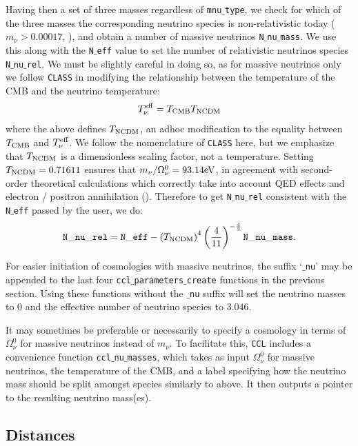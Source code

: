 \documentclass[\docopts]{\docclass}
\newcommand{\ccl}{{\tt CCL}\xspace}
\begin{document}
Having then a set of three masses regardless of {\tt mnu$\_$type}, we check for which of the three masses the corresponding neutrino species is non-relativistic today ($m_\nu>0.00017$, \citealt{Lesgourgues2012}), and obtain a number of massive neutrinos {\tt N$\_$nu$\_$mass}. We use this along with the {\tt N$\_$eff} value to set the number of relativistic neutrinos species {\tt N$\_$nu$\_$rel}. We must be slightly careful in doing so, as for massive neutrinos only we follow {\tt CLASS} in modifying the relationship between the temperature of the CMB and the neutrino temperature:
\begin{equation}
T_{\nu}^{\rm eff} = T_{\rm CMB} T_{\rm NCDM}
\label{Tnueff}
\end{equation}
where the above defines $T_{\rm NCDM}$, an adhoc modification to the equality between $T_{\rm CMB}$ and $T_{\nu}^{\rm eff}$. We follow the nomenclature of {\tt CLASS} here, but we emphasize that $T_{\rm NCDM}$ is a dimensionless scaling factor, not a temperature. Setting $T_{\rm NCDM}=0.71611$ ensures that $m_{\nu} / \Omega_{\nu}^0 = 93.14 {\rm eV}$, in agreement with second-order theoretical calculations which correctly take into account QED effects and electron / positron annihilation (\citealt{Mangano2005}). Therefore to get {\tt N$\_$nu$\_$rel} consistent with the {\tt N$\_$eff} passed by the user, we do:
\begin{equation}
{\tt N\_nu\_rel} = {\tt N\_eff} - \left(T_{\rm NCDM}\right)^{4} \left(\frac{4}{11}\right)^{-\frac{4}{3}} {\tt N\_nu\_mass}.
\label{Nnurel}
\end{equation}

For easier initiation of cosmologies with massive neutrinos, the suffix `{\tt $\_$nu}' may be appended to the last four {\tt ccl$\_$parameters$\_$create} functions in the previous section. Using these functions without the {\tt $\_$nu} suffix will set the neutrino masses to 0 and the effective number of neutrino species to $3.046$.

It may sometimes be preferable or necessarily to specify a cosmology in terms of $\Omega_\nu^0$ for massive neutrinos instead of $m_\nu$. To facilitate this, \ccl includes a convenience function {\tt ccl$\_$nu$\_$masses}, which takes as input $\Omega_\nu^0$ for massive neutrinos, the temperature of the CMB, and a label specifying how the neutrino mass should be split amongst species similarly to above. It then outputs a pointer to the resulting neutrino mass(es).


\subsection{Distances}
\label{sec:distances}
\end{document}
